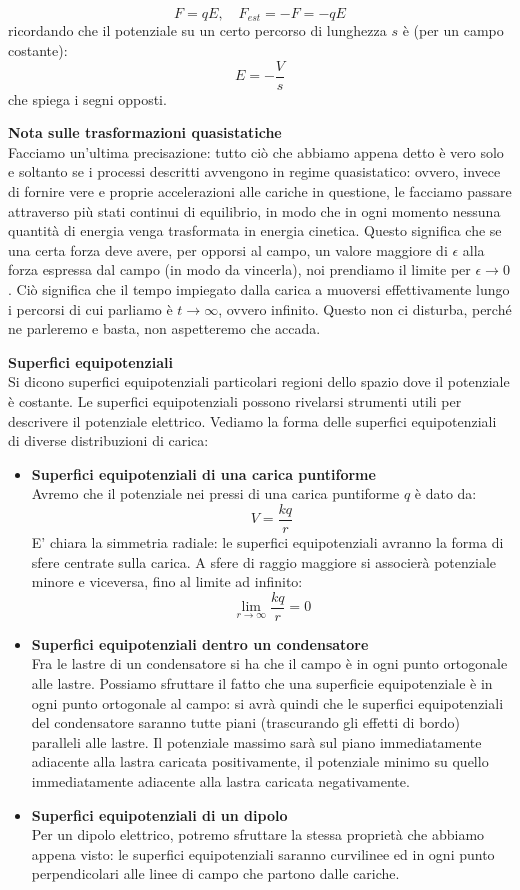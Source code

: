 \documentclass[a4paper,12pt]{article}
\begin{document}
$$ F = qE, \quad F_{est} = -F = -qE $$
ricordando che il potenziale su un certo percorso di lunghezza $s$ è (per un campo costante):
$$ E = -\frac{V}{s} $$
che spiega i segni opposti. \\
\par\smallskip
\textbf{Nota sulle trasformazioni quasistatiche} \\
Facciamo un'ultima precisazione: tutto ciò che abbiamo appena detto è vero solo e soltanto se i processi descritti avvengono in regime quasistatico: ovvero, invece di fornire vere e proprie accelerazioni alle cariche in questione,
le facciamo passare attraverso più stati continui di equilibrio, in modo che in ogni momento nessuna quantità di energia venga trasformata in energia cinetica. Questo significa che se una certa forza deve avere, per opporsi al campo, un valore maggiore di $\epsilon$ alla forza espressa dal campo (in modo da vincerla), noi prendiamo il limite per $\epsilon \rightarrow 0$. Ciò significa che il tempo impiegato dalla carica a muoversi effettivamente lungo i percorsi
di cui parliamo è $t \rightarrow \infty$, ovvero infinito. Questo non ci disturba, perché ne parleremo e basta, non aspetteremo che accada.
\par\smallskip
\textbf{Superfici equipotenziali} \\
Si dicono superfici equipotenziali particolari regioni dello spazio dove il potenziale è costante. Le superfici equipotenziali possono rivelarsi strumenti utili per descrivere il potenziale elettrico. Vediamo la forma delle superfici equipotenziali
di diverse distribuzioni di carica:
\begin{itemize}
  \item \textbf{Superfici equipotenziali di una carica puntiforme} \\
    Avremo che il potenziale nei pressi di una carica puntiforme $q$ è dato da:
    $$ V = \frac{kq}{r} $$
    E' chiara la simmetria radiale: le superfici equipotenziali avranno la forma di sfere centrate sulla carica. A sfere di raggio maggiore si associerà potenziale minore e viceversa, fino al limite ad infinito:
    $$ \lim_{r\rightarrow\infty} \frac{kq}{r} = 0 $$
  \item \textbf{Superfici equipotenziali dentro un condensatore} \\
    Fra le lastre di un condensatore si ha che il campo è in ogni punto ortogonale alle lastre. Possiamo sfruttare il fatto che una superficie equipotenziale è in ogni punto ortogonale al campo: si avrà quindi che le superfici
    equipotenziali del condensatore saranno tutte piani (trascurando gli effetti di bordo) paralleli alle lastre. Il potenziale massimo sarà sul piano immediatamente adiacente alla lastra caricata positivamente, il potenziale minimo
    su quello immediatamente adiacente alla lastra caricata negativamente.
  \item \textbf{Superfici equipotenziali di un dipolo} \\
    Per un dipolo elettrico, potremo sfruttare la stessa proprietà che abbiamo appena visto: le superfici equipotenziali saranno curvilinee ed in ogni punto perpendicolari alle linee di campo che partono dalle cariche.
\end{itemize}
\end{document}
